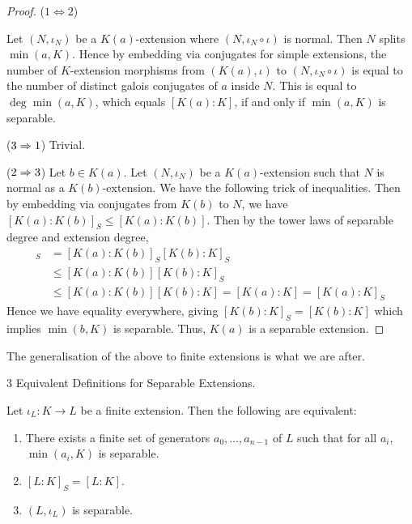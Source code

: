 \documentclass[../book.tex]{subfiles}
\begin{document}
\begin{proof}
    ($1\iff 2$)
    
        Let $(N,\iota_N)$ be a $K(a)$-extension where 
        $(N,\iota_N\circ\iota)$ is normal. 
        Then $N$ splits $\min(a,K)$. 
        Hence by embedding via conjugates for simple extensions,
        the number of $K$-extension morphisms 
        from $(K(a),\iota)$ to $(N,\iota_N\circ\iota)$
        is equal to the number of distinct galois conjugates of $a$
        inside $N$. 
        This is equal to $\deg\min(a,K)$, which equals $[K(a):K]$,
        if and only if $\min(a,K)$ is separable. 
        
    ($3\Rightarrow 1$) 
        Trivial.
    
    ($2 \Rightarrow 3$)
        Let $b \in K(a)$. 
        Let $(N,\iota_N)$ be a $K(a)$-extension such that 
        $N$ is normal as a $K(b)$-extension. 
        We have the following trick of inequalities. 
        Then by embedding via conjugates from $K(b)$ to $N$, 
        we have $[K(a):K(b)]_S \leq [K(a):K(b)]$.
        Then by the tower laws of separable degree and extension degree,
        \begin{align*}
            [K(a) : K]_S &= [K(a):K(b)]_S [K(b):K]_S \\
            &\leq [K(a):K(b)] [K(b):K]_S \\
            &\leq [K(a):K(b)] [K(b):K] = [K(a):K] = [K(a):K]_S
        \end{align*}
        Hence we have equality everywhere, giving 
        $[K(b):K]_S = [K(b):K]$ which implies $\min(b,K)$ is separable.
        Thus, $K(a)$ is a separable extension. 
\end{proof}
The generalisation of the above to finite extensions is what we are after. 
\begin{thm} 3 Equivalent Definitions for Separable Extensions.
    
    Let $\iota_L : K \to L$ be a finite extension.
    Then the following are equivalent:
    \begin{enumerate}
        \item There exists a finite set of generators $a_0,\dots,a_{n-1}$ of $L$ 
            such that for all $a_i$, $\min(a_i,K)$ is separable. 
        \item $[L:K]_S = [L:K]$.
        \item $(L,\iota_L)$ is separable.
    \end{enumerate}
\end{thm}
\end{document}

